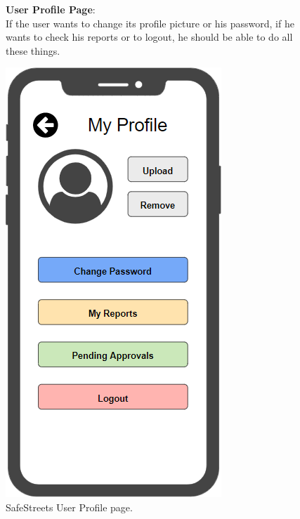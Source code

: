 \begin{figure}
	\begin{flushleft}
		\textbf{User Profile Page}:\\
		If the user wants to change its profile picture or his password, if he wants to check his reports or to logout, he should be able to do all these things. 
	\end{flushleft}
	\centering
	\includegraphics[width=0.6\linewidth]{../RASD/images/mockups/profile}
	\caption{SafeStreets User Profile page.}
	\label{fig:profile}
\end{figure}
\clearpage